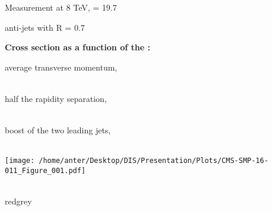\documentclass{beamer}
\begin{document}
\begin{frame}
\begin{minipage}[thbp]{0.55\textwidth}
\vspace{-1mm}
\begin{itemize}
\item {\footnotesize Measurement at 8 TeV, \lumi = 19.7 
\vspace{2.0mm} 
\item anti-\kt jets with R = 0.7
\vspace{2.0mm}
\item {\bf Cross section as a function of the :} \\} 
\begin{itemize}
\tri
\item {\footnotesize average transverse momentum, \\ \vspace{1mm} ~~~~ 
\vspace{3.mm}
\item half the rapidity separation, \\ \vspace{1mm} ~~~~
\vspace{3.mm} 
\item boost of the two leading jets, \\ \vspace{1mm} ~~~~ \\}
\tri
\end{itemize}
\ball
\end{itemize}
\end{minipage}
\hspace{-4mm}
\begin{minipage}[thbp]{0.3\textwidth}
\hspace*{-5mm}\texttt{[image: /home/anter/Desktop/DIS/Presentation/Plots/CMS-SMP-16-011\_Figure\_001.pdf]}\\\\
\hspace*{28mm}\begin{beamercolorbox}[wd=23mm,ht=1mm,center,shadow=true, rounded=true]{redgrey}
{}
{\scalebox {0.61} {}}
\end{beamercolorbox}
\end{minipage}
\end{frame}
\end{document}
